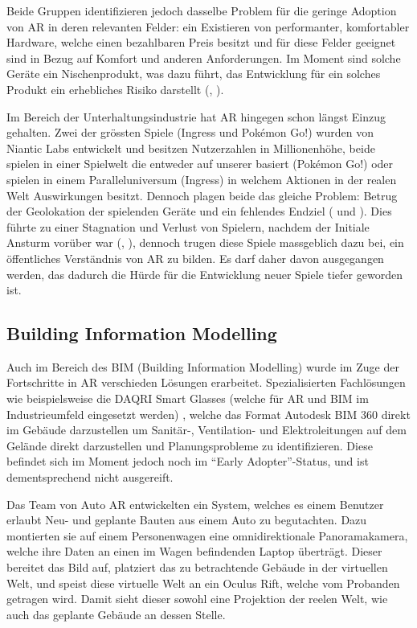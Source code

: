 \documentclass[a4paper]{scrreprt}
\begin{document}
Beide Gruppen identifizieren jedoch dasselbe Problem für die geringe Adoption von AR in deren relevanten Felder: ein Existieren von performanter, komfortabler Hardware, welche einen bezahlbaren Preis besitzt und für diese Felder geeignet sind in Bezug auf Komfort und anderen Anforderungen. Im Moment sind solche Geräte ein Nischenprodukt, was dazu führt, das Entwicklung für ein solches Produkt ein erhebliches Risiko darstellt (\cite{Piroozfar2018}, \cite{Pelargos2017}).

Im Bereich der Unterhaltungsindustrie hat AR hingegen schon längst Einzug gehalten. Zwei der grössten Spiele (Ingress und Pokémon Go!) wurden von Niantic Labs entwickelt und besitzen Nutzerzahlen in Millionenhöhe, beide spielen in einer Spielwelt die entweder auf unserer basiert (Pokémon Go!) oder spielen in einem Paralleluniversum (Ingress) in welchem Aktionen in der realen Welt Auswirkungen besitzt. Dennoch plagen beide das gleiche Problem: Betrug der Geolokation der spielenden Geräte und ein fehlendes Endziel (\cite{MRRX2015} und \cite{KamelBoulos2017}). Dies führte zu einer Stagnation und Verlust von Spielern, nachdem der Initiale Ansturm vorüber war (\cite{Arif2017}, \cite{KamelBoulos2017}), dennoch trugen diese Spiele massgeblich dazu bei, ein öffentliches Verständnis von AR zu bilden. Es darf daher davon ausgegangen werden, das dadurch die Hürde für die Entwicklung neuer Spiele tiefer geworden ist.

\subsection{Building Information Modelling}

Auch im Bereich des BIM (Building Information Modelling) wurde im Zuge der Fortschritte in AR verschieden Lösungen erarbeitet. Spezialisierten Fachlösungen wie beispielsweise die DAQRI Smart Glasses (welche für AR und BIM im Industrieumfeld eingesetzt werden) \parencite{DAQRI2018}, welche das Format Autodesk BIM 360 direkt im Gebäude darzustellen um Sanitär-, Ventilation- und Elektroleitungen auf dem Gelände direkt darzustellen und Planungsprobleme zu identifizieren. Diese befindet sich im Moment jedoch noch im \textquotedblleft Early Adopter\textquotedblright-Status, und ist dementsprechend nicht ausgereift.

Das Team von Auto AR \parencite{Opperman2015} entwickelten ein System, welches es einem Benutzer erlaubt Neu- und geplante Bauten aus einem Auto zu begutachten. Dazu montierten sie auf einem Personenwagen eine omnidirektionale Panoramakamera, welche ihre Daten an einen im Wagen befindenden Laptop überträgt. Dieser bereitet das Bild auf, platziert das zu betrachtende Gebäude in der virtuellen Welt, und speist diese virtuelle Welt an ein Oculus Rift, welche vom Probanden getragen wird. Damit sieht dieser sowohl eine Projektion der reelen Welt, wie auch das geplante Gebäude an dessen Stelle.
\end{document}
